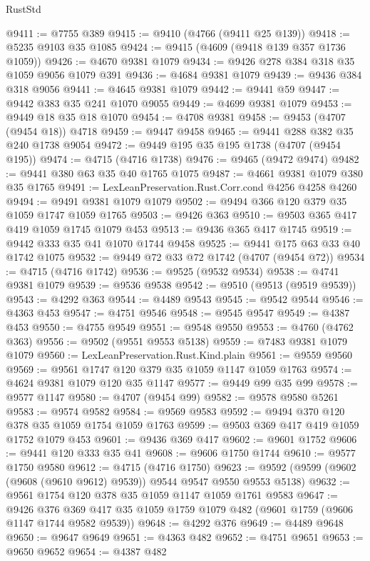 \begin{lexlean}{RustStd}
\begin{coremodule}
@9411 := @7755 @389
@9415 := @9410 (@4766 (@9411 @25 @139))
@9418 := @5235 @9103 @35 @1085
@9424 := @9415 (@4609 (@9418 @139 @357 @1736 @1059))
@9426 := @4670 @9381 @1079
@9434 := @9426 @278 @384 @318 @35 @1059 @9056 @1079 @391
@9436 := @4684 @9381 @1079
@9439 := @9436 @384 @318 @9056
@9441 := @4645 @9381 @1079
@9442 := @9441 @59
@9447 := @9442 @383 @35 @241 @1070 @9055
@9449 := @4699 @9381 @1079
@9453 := @9449 @18 @35 @18 @1070
@9454 := @4708 @9381
@9458 := @9453 (@4707 (@9454 @18)) @4718
@9459 := @9447 @9458
@9465 := @9441 @288 @382 @35 @240 @1738 @9054
@9472 := @9449 @195 @35 @195 @1738 (@4707 (@9454 @195))
@9474 := @4715 (@4716 @1738)
@9476 := @9465 (@9472 @9474)
@9482 := @9441 @380 @63 @35 @40 @1765 @1075
@9487 := @4661 @9381 @1079 @380 @35 @1765
@9491 := LexLeanPreservation.Rust.Corr.cond @4256 @4258 @4260
@9494 := @9491 @9381 @1079 @1079
@9502 := @9494 @366 @120 @379 @35 @1059 @1747 @1059 @1765
@9503 := @9426 @363
@9510 := @9503 @365 @417 @419 @1059 @1745 @1079 @453
@9513 := @9436 @365 @417 @1745
@9519 := @9442 @333 @35 @41 @1070 @1744 @9458
@9525 := @9441 @175 @63 @33 @40 @1742 @1075
@9532 := @9449 @72 @33 @72 @1742 (@4707 (@9454 @72))
@9534 := @4715 (@4716 @1742)
@9536 := @9525 (@9532 @9534)
@9538 := @4741 @9381 @1079
@9539 := @9536 @9538
@9542 := @9510 (@9513 (@9519 @9539))
@9543 := @4292 @363
@9544 := @4489 @9543
@9545 := @9542 @9544
@9546 := @4363 @453
@9547 := @4751 @9546
@9548 := @9545 @9547
@9549 := @4387 @453
@9550 := @4755 @9549
@9551 := @9548 @9550
@9553 := @4760 (@4762 @363)
@9556 := @9502 (@9551 @9553 @5138)
@9559 := @7483 @9381 @1079 @1079
@9560 := LexLeanPreservation.Rust.Kind.plain
@9561 := @9559 @9560
@9569 := @9561 @1747 @120 @379 @35 @1059 @1147 @1059 @1763
@9574 := @4624 @9381 @1079 @120 @35 @1147
@9577 := @9449 @99 @35 @99
@9578 := @9577 @1147
@9580 := @4707 (@9454 @99)
@9582 := @9578 @9580 @5261
@9583 := @9574 @9582
@9584 := @9569 @9583
@9592 := @9494 @370 @120 @378 @35 @1059 @1754 @1059 @1763
@9599 := @9503 @369 @417 @419 @1059 @1752 @1079 @453
@9601 := @9436 @369 @417
@9602 := @9601 @1752
@9606 := @9441 @120 @333 @35 @41
@9608 := @9606 @1750 @1744
@9610 := @9577 @1750 @9580
@9612 := @4715 (@4716 @1750)
@9623 := @9592 (@9599 (@9602 (@9608 (@9610 @9612) @9539)) @9544 @9547 @9550 @9553 @5138)
@9632 := @9561 @1754 @120 @378 @35 @1059 @1147 @1059 @1761 @9583
@9647 := @9426
    @376
    @369
    @417
    @35
    @1059
    @1759
    @1079
    @482
    (@9601 @1759 (@9606 @1147 @1744 @9582 @9539))
@9648 := @4292 @376
@9649 := @4489 @9648
@9650 := @9647 @9649
@9651 := @4363 @482
@9652 := @4751 @9651
@9653 := @9650 @9652
@9654 := @4387 @482

\end{coremodule}
\end{lexlean}
